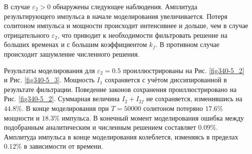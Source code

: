 \documentclass[14pt,a4paper]{extreport}
\begin{document}
			В случае \(\varepsilon_{2}>0\) обнаружены следующее наблюдения. Амплитуда результирующего импульса в начале моделирования увеличивается. Потеря солитоном импульса и мощности происходит интенсивнее и дольше, чем в случае отрицательного \(\varepsilon_{2}\), что приводит к необходимости фильтровать решение на больших временах и с большим коэффициентом \(k_{f}\). В противном случае происходит зашумление численного решения.

			Результаты моделирования для \(\varepsilon_{2}=0.5\) проиллюстрированы на Рис. \ref{fig340-5_2} и Рис. \ref{fig340-5_3}. Мощность \(I_{1}\) сохраняется с учётом диссипированной в результате фильтрации. Поведение законов сохранения проиллюстрировано на Рис. \ref{fig340-5_2}. Суммарная величина \(I_{2}+I_{2f}\) не сохраняется, изменившись на \(44.8\%\). В конце моделирования при \(T=50000\) солитоном потеряно \(17.6\%\) мощности и \(18.3\%\) импульса. В конечный момент моделирования ошибка между подобранным аналитическим и численным решением составляет \(0.09\%\). Амплитуда импульса в конце моделирования колеблется, изменяясь в пределах \(0.12\%\) в зависимости от времени.
\end{document}
